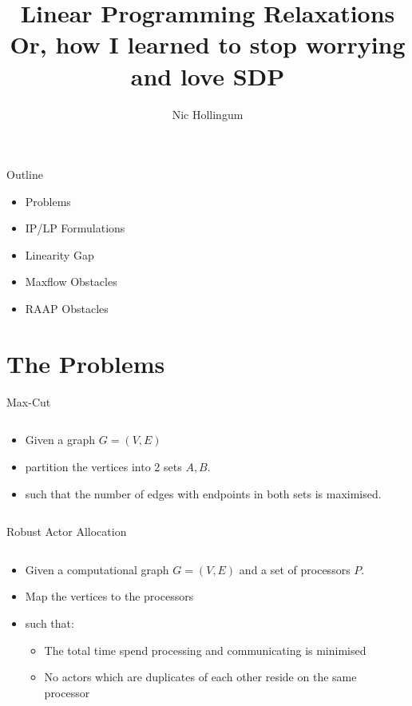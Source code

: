 \documentclass{beamer}
\title[LP Relaxations]{Linear Programming Relaxations \\ Or, how I learned to stop worrying and love SDP}
\author{Nic Hollingum}
\institute{USYD}
\begin{document}
\begin{frame}
\titlepage
\end{frame}

\begin{frame}{Outline}
\begin{itemize}
	\item Problems
	\item IP/LP Formulations
	\item Linearity Gap
	\item Maxflow Obstacles
	\item RAAP Obstacles
\end{itemize}
\end{frame}

\section{The Problems}

\begin{frame}{Max-Cut}
\begin{columns}
\begin{column}{6cm}
\begin{itemize}
	\item Given a graph $G=(V,E)$
	\item partition the vertices into 2 sets $A, B$.
	\item such that the number of edges with endpoints in both sets is maximised.
\end{itemize}
\end{column}
\begin{column}{4cm}
\end{column}
\end{columns}
\end{frame}

\begin{frame}{Robust Actor Allocation}
\begin{columns}
\begin{column}{6cm}
\begin{itemize}
	\item Given a computational graph $G=(V,E)$ and a set of processors $P$.
	\item Map the vertices to the processors
	\item such that:
	\begin{itemize}
		\item The total time spend processing and communicating is minimised
		\item No actors which are duplicates of each other reside on the same processor
	\end{itemize}
\end{itemize}
\end{column}
\begin{column}{4cm}
\end{column}
\end{columns}
\end{frame}
\end{document}
